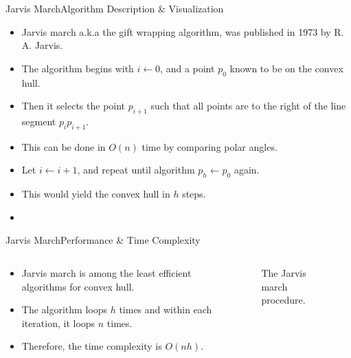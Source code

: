 \documentclass{beamer}
\begin{document}
    \begin{frame}{Jarvis March}{Algorithm Description \& Visualization}
        \begin{itemize}
            \item Jarvis march a.k.a the gift wrapping algorithm, was published in 
            1973 by R. A. Jarvis.
            \item The algorithm begins with $i\leftarrow0$, and a point $p_0$ known to be on the convex hull. 
            \item Then it selects the point $p_{i+1}$ such that all points are to the right of the line segment $p_ip_{i+1}$.
            \item This can be done in $O(n)$ time by comparing polar angles.
            \item Let $i\leftarrow i+1$, and repeat until algorithm $p_h \leftarrow p_0$ again. 
            \item This would yield the convex hull in $h$ steps. 
            \item \href{https://upload.wikimedia.org/wikipedia/commons/9/9c/Animation_depicting_the_gift_wrapping_algorithm.gif}{\color{magenta}{Here is a link to an animation for Jarvis march.}}
        \end{itemize}
    \end{frame}
  
  
  \begin{frame}{Jarvis March}{Performance \& Time Complexity}
 \begin{columns}
\begin{column}{0.48\textwidth}
    \begin{itemize}
        \item Jarvis march is among the least efficient algorithms for 
        convex hull. 
        \item The algorithm loops $h$ times and within each iteration, it 
        loops $n$ times.
        \item Therefore, the time complexity is $O(nh)$.
    \end{itemize}
\end{column}
\begin{column}{0.46\textwidth}
    \begin{figure}
    \scalebox{0.75}{
    \centering
    \def\svgwidth{\columnwidth}
    }
    \caption{The Jarvis march procedure.}
    \end{figure}
    \end{column}
    \end{columns}
  \end{frame}
  
\end{document}
